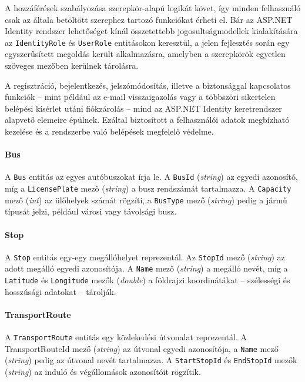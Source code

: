 A hozzáférések szabályozása szerepkör-alapú logikát követ, így minden felhasználó csak az általa betöltött szerephez tartozó funkciókat érheti el. Bár az ASP.NET Identity rendszer lehetőséget kínál összetettebb jogosultságmodellek kialakítására az \texttt{IdentityRole} és \texttt{UserRole} entitásokon keresztül, a jelen fejlesztés során egy egyszerűsített megoldás került alkalmazásra, amelyben a szerepkörök egyetlen szöveges mezőben kerülnek tárolásra.

A regisztráció, bejelentkezés, jelszómódosítás, illetve a biztonsággal kapcsolatos funkciók – mint például az e-mail visszaigazolás vagy a többszöri sikertelen belépési kísérlet utáni fiókzárolás – mind az ASP.NET Identity keretrendszer alapvető elemeire épülnek. Ezáltal biztosított a felhasználói adatok megbízható kezelése és a rendszerbe való belépések megfelelő védelme.


\paragraph{Bus}

A \texttt{Bus} entitás az egyes autóbuszokat írja le. A \texttt{BusId} (\textit{string}) az egyedi azonosító, míg a \texttt{LicensePlate} mező (\textit{string}) a busz rendszámát tartalmazza. A \texttt{Capacity} mező (\textit{int}) az ülőhelyek számát rögzíti, a \texttt{BusType} mező (\textit{string}) pedig a jármű típusát jelzi, például városi vagy távolsági busz.

\paragraph{Stop}

A \texttt{Stop} entitás egy-egy megállóhelyet reprezentál. Az \texttt{StopId} mező (\textit{string}) az adott megálló egyedi azonosítója. A \texttt{Name} mező (\textit{string}) a megálló nevét, míg a \texttt{Latitude} és \texttt{Longitude} mezők (\textit{double}) a földrajzi koordinátákat – szélességi és hosszúsági adatokat – tárolják.

\paragraph{TransportRoute}

A \texttt{TransportRoute} entitás egy közlekedési útvonalat reprezentál. A TransportRouteId mező (\textit{string}) az útvonal egyedi azonosítója, a \texttt{Name} mező (\textit{string}) pedig az útvonal nevét tartalmazza. A \texttt{StartStopId} és \texttt{EndStopId} mezők (\textit{string}) az induló és végállomások azonosítóit rögzítik.

